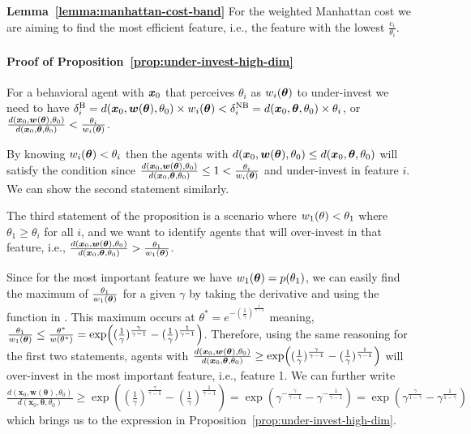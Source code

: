 \textbf{Lemma~\ref{lemma:manhattan-cost-band}} For the weighted Manhattan cost we are aiming to find the most efficient feature, i.e., the feature with the lowest $\frac{c_i}{\theta_i}$. 

\paragraph{Proof of Proposition~\ref{prop:under-invest-high-dim}}For a behavioral agent with ${\bm{x}}_0$ that perceives $\theta_i$ as ${w}_i({\bm{\theta}})$ to under-invest we need to have $\delta_i^{\text{B}}=d({\bm{x}}_0, {\bm{w}}({\bm{\theta}}), \theta_0)\times {w}_i({\bm{\theta}}) < \delta_i^{\text{NB}}=d({\bm{x}}_0, {\bm{\theta}}, \theta_0)\times \theta_i$, or $\frac{d({\bm{x}}_0, {\bm{w}}({\bm{\theta}}), \theta_0)}{d({\bm{x}}_0, {\bm{\theta}}, \theta_0)}<\frac{\theta_i}{{w}_i({\bm{\theta}})}$. 

By knowing ${w}_i({\bm{\theta}})<\theta_i$ then the agents with $d({\bm{x}}_0, {\bm{w}}({\bm{\theta}}), \theta_0)\le d({\bm{x}}_0, {\bm{\theta}}, \theta_0)$ will satisfy the condition since $\frac{d({\bm{x}}_0, {\bm{w}}({\bm{\theta}}), \theta_0)}{d({\bm{x}}_0, {\bm{\theta}}, \theta_0)}\le 1 < \frac{\theta_i}{{w}_i({\bm{\theta}})}$ and under-invest in feature $i$. We can show the second statement similarly. 

The third statement of the proposition is a scenario where ${w}_1(\theta)<\theta_1$ where $\theta_1\ge \theta_i$ for all $i$, and we want to identify agents that will over-invest in that feature, i.e., $\frac{d({\bm{x}}_0, {\bm{w}}({\bm{\theta}}), \theta_0)}{d({\bm{x}}_0, {\bm{\theta}}, \theta_0)}>\frac{\theta_1}{{w}_1({\bm{\theta}})}$. 

Since for the most important feature we have ${w}_1({\bm{\theta}})=p(\theta_1)$, we can easily find the maximum of $\frac{\theta_1}{{w}_1({\bm{\theta}})}$ for a given $\gamma$ by taking the derivative and using the function in \cite{Prelec1998}. This maximum occurs at $\theta^* = e^{-(\frac{1}{\gamma})^\frac{1}{\gamma-1}}$ meaning, $\frac{\theta_1}{{w}_1({\bm{\theta}})}\le \frac{\theta^*}{{w}(\theta^*)} = \exp((\frac{1}{\gamma})^\frac{\gamma}{\gamma-1}-(\frac{1}{\gamma})^\frac{1}{\gamma-1})$. Therefore, using the same reasoning for the first two statements, agents with $\frac{d({\bm{x}}_0, {\bm{w}}({\bm{\theta}}), \theta_0)}{d({\bm{x}}_0, {\bm{\theta}}, \theta_0)}\ge \exp((\frac{1}{\gamma})^\frac{\gamma}{\gamma-1}-(\frac{1}{\gamma})^\frac{1}{\gamma-1})$ will over-invest in the most important feature, i.e., feature 1. {We can further write $\frac{d(\boldsymbol{x}_0, \boldsymbol{w}(\boldsymbol{\theta}), \theta_0)}{d(\boldsymbol{x}_0, \boldsymbol{\theta}, \theta_0)}\ge \exp((\frac{1}{\gamma})^\frac{\gamma}{\gamma-1}-(\frac{1}{\gamma})^\frac{1}{\gamma-1}) = \exp(\gamma^{-\frac{\gamma}{\gamma-1}}-\gamma^{-\frac{1}{\gamma-1}}) = \exp(\gamma^{\frac{\gamma}{1-\gamma}}-\gamma^{\frac{1}{1-\gamma}})$ which brings us to the expression in Proposition~\ref{prop:under-invest-high-dim}.}

